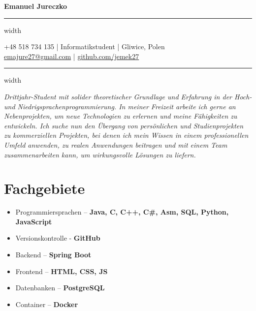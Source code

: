 \documentclass[11pt,letterpaper]{article}
\newcommand{\name}[1]{
  \begin{center}
    \Huge\textbf{#1}
  \end{center}
  \vspace{-0.5em}
  \hrule height 0.4pt width \textwidth
  \vspace{0.5em}
}
\newcommand{\contact}[5]{
  \begin{center}
    #1 | #2 | #3 \\
    #4 | #5
  \end{center}
  \vspace{-0.5em}
  \hrule height 0.4pt width \textwidth
  \vspace{0.5em}
}
\newcommand{\spacedSection}[1]{
  \vspace{0.1em}
  \section{#1}
  \vspace{1em}
}
\begin{document}
\name{Emanuel Jureczko}
\vspace{-0.5em}
\contact{+48 518 734 135}{Informatikstudent}{Gliwice, Polen}
{\href{mailto:emajure27@gmail.com}{emajure27@gmail.com}}{\href{https://github.com/jemek27}{github.com/jemek27}}

\vspace{-0.5em}
\begin{justify}
\textit{Drittjahr-Student mit solider theoretischer Grundlage und Erfahrung in der Hoch- und Niedrigsprachenprogrammierung.
In meiner Freizeit arbeite ich gerne an Nebenprojekten, um neue Technologien zu erlernen und meine Fähigkeiten zu entwickeln.
Ich suche nun den Übergang von persönlichen und Studienprojekten zu kommerziellen Projekten, bei denen ich mein Wissen
in einem professionellen Umfeld anwenden, zu realen Anwendungen beitragen und mit einem Team zusammenarbeiten kann, um wirkungsvolle Lösungen zu liefern.}
\end{justify}

\spacedSection{Fachgebiete}

\begin{minipage}[t]{0.33\textwidth}
    \begin{flushleft}
        \begin{itemize}[leftmargin=0.5cm]
            \setlength\itemsep{0.4em}
            \item Programmiersprachen – \textbf{Java, C, C++, C\#, Asm, SQL, Python, JavaScript}
            \item Versionskontrolle - \textbf{GitHub}
        \end{itemize}
    \end{flushleft}
\end{minipage}
\begin{minipage}[t]{0.33\textwidth}
    \begin{flushleft}
        \begin{itemize}[leftmargin=0.5cm]
        \setlength\itemsep{0.4em}
            \item Backend – \textbf{Spring Boot}
            \item Frontend – \textbf{HTML, CSS, JS}
        \end{itemize}
    \end{flushleft}
\end{minipage}
\begin{minipage}[t]{0.33\textwidth}
    \begin{flushleft}
        \begin{itemize}[leftmargin=0.5cm]
        \setlength\itemsep{0.4em}
            \item Datenbanken – \textbf{PostgreSQL}
            \item Container – \textbf{Docker}
        \end{itemize}
    \end{flushleft}
\end{minipage}
\end{document}
